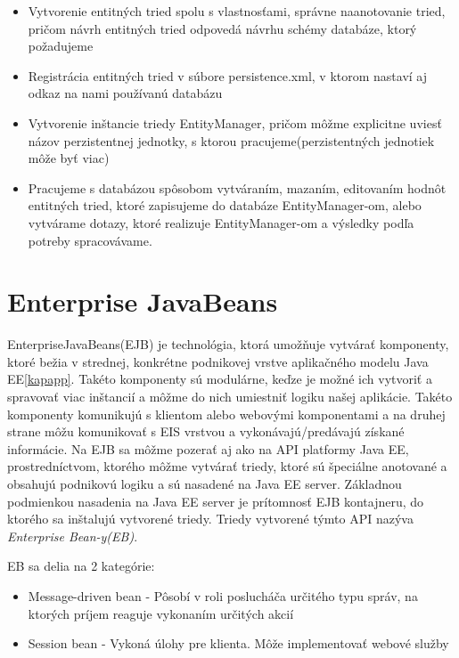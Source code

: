 \begin{itemize}
\item Vytvorenie entitných tried spolu s vlastnosťami, správne naanotovanie tried, pričom návrh entitných tried odpovedá návrhu schémy databáze, ktorý požadujeme
\item Registrácia entitných tried v súbore persistence.xml, v ktorom nastaví aj odkaz na nami používanú databázu
\item Vytvorenie inštancie triedy EntityManager, pričom môžme explicitne uviesť názov perzistentnej jednotky, s ktorou pracujeme(perzistentných jednotiek môže byť viac)
\item Pracujeme s databázou spôsobom vytváraním, mazaním, editovaním hodnôt entitných tried, ktoré zapisujeme do databáze EntityManager-om, alebo vytvárame dotazy, ktoré realizuje EntityManager-om a výsledky podľa potreby spracovávame.
\end{itemize}


\section{Enterprise JavaBeans}\label{ejbkap}
EnterpriseJavaBeans(EJB) je technológia, ktorá umožňuje vytvárať komponenty, ktoré bežia v strednej, konkrétne podnikovej vrstve aplikačného modelu Java EE\cite{ejbbook}\ref{kapapp}. Takéto komponenty sú modulárne, keďze je možné ich vytvoriť a spravovať viac inštancií a môžme do nich umiestniť logiku našej aplikácie. Takéto komponenty komunikujú s klientom alebo webovými komponentami a na druhej strane môžu komunikovať s EIS vrstvou a vykonávajú/predávajú získané informácie. Na EJB sa môžme pozerať aj ako na API platformy Java EE, prostredníctvom, ktorého môžme vytvárať triedy, ktoré sú špeciálne anotované a obsahujú podnikovú logiku a sú nasadené na Java EE server. Základnou podmienkou nasadenia na Java EE server je prítomnosť EJB kontajneru, do ktorého sa inštalujú vytvorené triedy. Triedy vytvorené týmto API nazýva \emph{Enterprise Bean-y(EB)}.

EB sa delia na 2 kategórie:
\begin{itemize}
\item Message-driven bean - Pôsobí v roli poslucháča  určitého typu správ, na ktorých príjem reaguje vykonaním určitých akcií\cite{fitweb}
\item Session bean - Vykoná úlohy pre klienta. Môže implementovať webové služby\cite{fitweb}

\end{itemize}


